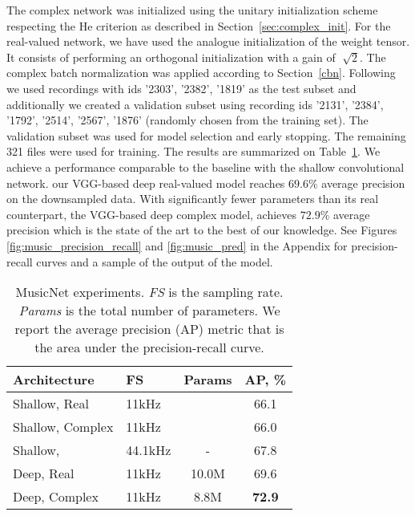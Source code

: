 \documentclass{article}
\begin{document}
The complex network was initialized using the unitary initialization scheme respecting the He criterion as described in Section~\ref{sec:complex_init}. For the real-valued network, we have used the analogue initialization of the weight tensor. It consists of performing an orthogonal initialization with a gain of $\sqrt[]{2}$. The complex batch normalization was applied according to Section~\ref{cbn}.
Following \citet{thickstun2016learning} we used recordings with ids '2303', '2382', '1819' as the test subset and additionally we 
created a validation subset using recording ids '2131', '2384', '1792', '2514', '2567', '1876' (randomly chosen from the training set).
The validation subset was used for model selection and early stopping. The remaining 321 files were used for training.
The results are summarized on Table~\ref{tab:musicnet}. We achieve a performance comparable to the baseline with the shallow convolutional network. our VGG-based deep real-valued model reaches $69.6\%$ average precision on the downsampled data. With significantly fewer parameters than its real counterpart, the VGG-based deep complex model, achieves $72.9\%$ average precision which is the state of the art to the best of our knowledge. See Figures \ref{fig:music_precision_recall} and \ref{fig:music_pred} in the Appendix for precision-recall curves and a sample of the output of the model.

\begin{table}[t]
\vskip 0.15in
\begin{center}
\caption{MusicNet experiments. \emph{FS} is the sampling rate. \emph{Params} is the total number of parameters. We report the average precision (AP) metric that is the area under the precision-recall curve.}
\label{tab:musicnet}
\begin{small}
\begin{sc}
\begin{tabular}{llc|c}
\toprule
Architecture & FS & Params & AP, \% \\
\midrule
Shallow, Real & 11kHz &  & 66.1 \\
Shallow, Complex & 11kHz & & 66.0 \\
Shallow, \citet{thickstun2016learning} & 44.1kHz & - & 67.8 \\
\midrule
Deep, Real & 11kHz & 10.0M &  69.6 \\
Deep, Complex & 11kHz & 8.8M & \textbf{72.9} \\
\bottomrule
\end{tabular}
\end{sc}
\end{small}
\end{center}
\vskip -0.1in
\end{table}
\end{document}
